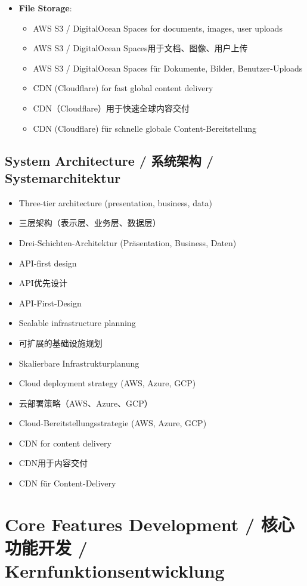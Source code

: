 \begin{itemize}
    \item \textbf{File Storage}:
    \begin{itemize}
        \item AWS S3 / DigitalOcean Spaces for documents, images, user uploads
        \item AWS S3 / DigitalOcean Spaces用于文档、图像、用户上传
        \item AWS S3 / DigitalOcean Spaces für Dokumente, Bilder, Benutzer-Uploads
        \item CDN (Cloudflare) for fast global content delivery
        \item CDN（Cloudflare）用于快速全球内容交付
        \item CDN (Cloudflare) für schnelle globale Content-Bereitstellung
    \end{itemize}
\end{itemize}

\subsection{System Architecture / 系统架构 / Systemarchitektur}
\begin{itemize}
    \item Three-tier architecture (presentation, business, data)
    \item 三层架构（表示层、业务层、数据层）
    \item Drei-Schichten-Architektur (Präsentation, Business, Daten)
    \item API-first design
    \item API优先设计
    \item API-First-Design
    \item Scalable infrastructure planning
    \item 可扩展的基础设施规划
    \item Skalierbare Infrastrukturplanung
    \item Cloud deployment strategy (AWS, Azure, GCP)
    \item 云部署策略（AWS、Azure、GCP）
    \item Cloud-Bereitstellungsstrategie (AWS, Azure, GCP)
    \item CDN for content delivery
    \item CDN用于内容交付
    \item CDN für Content-Delivery
\end{itemize}

\section{Core Features Development / 核心功能开发 / Kernfunktionsentwicklung}

